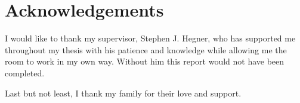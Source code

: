 \chapter{Acknowledgements}
\label{chap:acknowledgements}
I would like to thank my supervisor, Stephen J. Hegner, who has supported me 
throughout my thesis with his patience and knowledge 
while allowing me the room to work in my own way. 
Without him this report would not have been completed.

Last but not least, I thank my family for their love and support.

